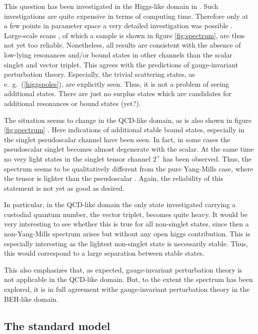 \documentclass[final,12pt,3p,longtitle]{elsarticle}
\newcommand*{\pref}[1]{(\ref{#1})}
\newcommand*{\1}{1\!\!\!\bot}
\begin{document}
This question has been investigated in the Higgs-like domain in \cite{Maas:2014pba,Wurtz:2013ova}. Such investigations are quite expensive in terms of computing time. Therefore only at a few points in parameter space a very detailed investigation was possible \cite{Wurtz:2013ova}. Large-scale scans \cite{Maas:2014pba}, of which a sample is shown in figure \ref{fig:spectrum}, are thus not yet too reliable. Nonetheless, all results are consistent with the absence of low-lying resonances and/or bound states in other channels than the scalar singlet and vector triplet. This agrees with the predictions of gauge-invariant perturbation theory. Especially, the trivial scattering states, as e.\ g.\ \pref{higgspoles}, are explicitly seen. Thus, it is not a problem of seeing additional states. There are just no surplus states which are candidates for additional resonances or bound states (yet?).

The situation seems to change in the QCD-like domain, as is also shown in figure \ref{fig:spectrum} \cite{Maas:2014pba}. Here indications of additional stable bound states, especially in the singlet pseudoscalar channel have been seen. In fact, in some cases the pseudoscalar singlet becomes almost degenerate with the scalar. At the same time no very light states in the singlet tensor channel $2^+$ has been observed. Thus, the spectrum seems to be qualitatively different from the pure Yang-Mills case, where the tensor is lighter than the pseudoscalar \cite{Mathieu:2008me}. Again, the reliability of this statement is not yet as good as desired.

In particular, in the QCD-like domain the only state investigated carrying a custodial quantum number, the vector triplet, becomes quite heavy. It would be very interesting to see whether this is true for all non-singlet states, since then a non-Yang-Mills spectrum arises but without any open higgs contribution. This is especially interesting as the lightest non-singlet state is necessarily stable. Thus, this would correspond to a large separation between stable states.

This also emphasizes that, as expected, gauge-invariant perturbation theory is not applicable in the QCD-like domain. But, to the extent the spectrum has been explored, it is in full agreement withe gauge-invariant perturbation theory in the BEH-like domain.

\subsection{The standard model}\label{ss:sm}
\end{document}
